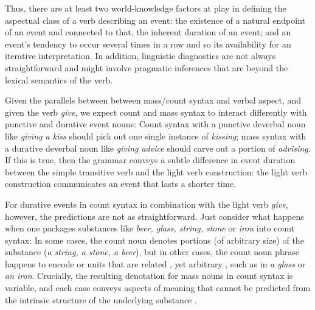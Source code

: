 \documentclass[preprint,12pt,authoryear]{elsarticle}
\begin{document}
{Thus, there are at least two world-knowledge factors at play in defining the aspectual class of a verb describing an event: the existence of a natural endpoint of an event and connected to that, the inherent duration of an event; and an event's tendency to occur several times in a row and so its availability for an iterative interpretation. In addition, linguistic diagnostics are not always straightforward and might involve pragmatic inferences that are beyond the lexical semantics of the verb.} 

 Given the parallels between between mass/count syntax and verbal aspect, and given the  verb \emph{give}, we expect count and mass syntax to interact differently with punctive and durative event nouns: Count syntax with a punctive deverbal noun like \emph{giving a kiss} should pick out one single instance of \emph{kissing}; mass syntax with a durative deverbal noun like \emph{giving advice} should carve out a portion of \emph{advising}. If this is true, then the grammar conveys a subtle difference in event duration between the simple transitive verb and the light verb construction: the light verb construction communicates an event that lasts a shorter time.

For durative events in count syntax in combination with the  light verb \emph{give}, however, the predictions are not as straightforward. Just consider what happens when one packages substances like \emph{beer, glass, string, stone} or \emph{iron} into count syntax: In some cases, the count noun denotes portions (of arbitrary size) of the substance (\emph{a string, a stone, a beer}), but in other cases, the count noun phrase happens to encode  or units that are related , yet  arbitrary , such as in \emph{a glass} or \emph{an iron}. Crucially, the resulting denotation for mass nouns in count syntax is variable, and each case conveys aspects of meaning that cannot be predicted from the intrinsic structure of the underlying substance  \citep{gordon1985evaluating,srinivasan2015concepts}. 
\end{document}
